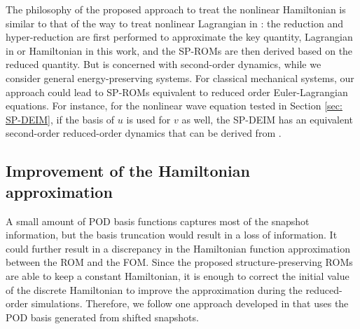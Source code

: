 \documentclass[11pt]{article}
\begin{document}
\begin{remark} The philosophy of the proposed approach to treat the nonlinear Hamiltonian is similar to that of the way to treat nonlinear Lagrangian in \cite{carlberg2015preserving}: the reduction and hyper-reduction are first performed to approximate the key quantity, Lagrangian in \cite{carlberg2015preserving} or Hamiltonian in this work, and the SP-ROMs are then derived based on the reduced quantity. But \cite{carlberg2015preserving} is concerned with second-order dynamics, while we consider general energy-preserving systems. For classical mechanical systems, our approach could lead to SP-ROMs equivalent to reduced order Euler-Lagrangian equations. For instance, for the nonlinear wave equation tested in Section \ref{sec: SP-DEIM}, if the basis of $u$ is used for $v$ as well, the SP-DEIM has an equivalent second-order reduced-order dynamics that can be derived from \cite{carlberg2015preserving}. 
\end{remark} 
\subsection{Improvement of the Hamiltonian approximation}\label{sec: sp_deim2}
A small amount of POD basis functions captures most of the snapshot information, but the basis truncation would result in a loss of information. It could further result in a discrepancy in the Hamiltonian function approximation between the ROM and the FOM.
Since the proposed structure-preserving ROMs are able to keep a constant Hamiltonian, it is enough to correct the initial value of the discrete Hamiltonian to improve the approximation during the reduced-order simulations.
Therefore, we follow one approach developed in \cite{gong2017structure} that uses the POD basis generated from shifted snapshots. 
\end{document}
